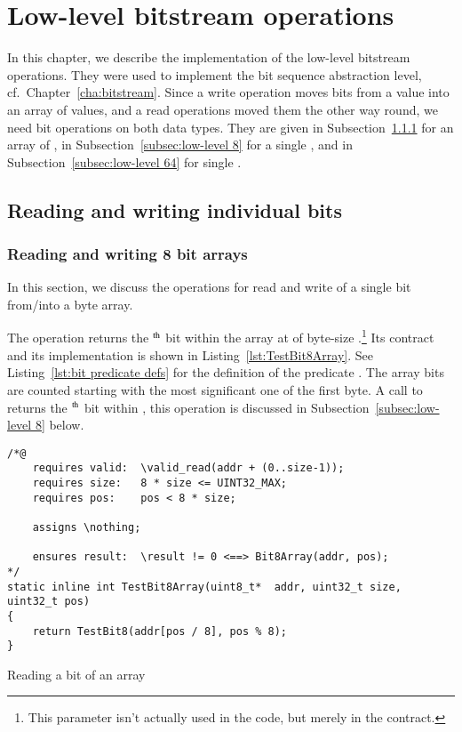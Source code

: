 
\FloatBarrier

\chapter{Low-level bitstream operations}
\label{cha:low-level bitstream}

In this chapter, we describe the implementation of the
low-level bitstream operations.
%
They were used to implement the bit sequence abstraction level, cf.\
Chapter~\ref{cha:bitstream}.
%
Since a write operation moves bits from a  value
into an array of  values, and a read operations
moved them the other way round,
we need bit operations on both data types.
%
They are given in
Subsection~\ref{subsec:low-level 8 array} 
for an array of , 
in Subsection~\ref{subsec:low-level 8} for a single ,
and
in Subsection~\ref{subsec:low-level 64} for single .



\section{Reading and writing individual bits}


\subsection{Reading and writing 8 bit arrays}
\label{subsec:low-level 8 array}


In this section, we discuss the operations for read and write of a
single bit from/into a byte array.

The operation  returns the
$^{\mbox{\scriptsize th}}$ bit
within the array at 
of byte-size .\footnote{
	This parameter isn't actually used in the code, but merely
	in the contract.
}
Its contract and its implementation is shown in
Listing~\ref{lst:TestBit8Array}.
%
See Listing~\ref{lst:bit predicate defs} for the definition of the predicate
\inl{Bit8Array}.
%
The array bits are counted starting with the most significant one of
the first byte.
%
A call to  returns the 
$^{\mbox{\scriptsize th}}$ bit
within , this operation is discussed in
Subsection~\ref{subsec:low-level 8} below.


\begin{listing}[hbt]
\begin{minipage}{0.99\textwidth}
\begin{lstlisting}[style=acsl-block]
/*@
    requires valid:  \valid_read(addr + (0..size-1));
    requires size:   8 * size <= UINT32_MAX;
    requires pos:    pos < 8 * size;

    assigns \nothing;

    ensures result:  \result != 0 <==> Bit8Array(addr, pos);
*/
static inline int TestBit8Array(uint8_t*  addr, uint32_t size, uint32_t pos)
{
    return TestBit8(addr[pos / 8], pos % 8);
}
\end{lstlisting}
\end{minipage}
\caption{\label{lst:TestBit8Array}Reading a bit of an  array}
\end{listing}

